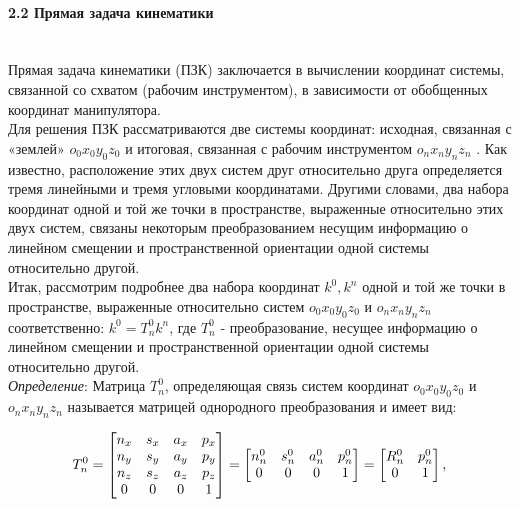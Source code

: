 \paragraph*{2.2 Прямая задача кинематики}$\phantom{-}$\\
\hspace*{\parindent} Прямая задача кинематики (ПЗК) заключается в вычислении координат системы, связанной со схватом (рабочим инструментом), в зависимости от обобщенных координат манипулятора.\\
\hspace*{\parindent}Для решения ПЗК рассматриваются две системы координат: исходная, связанная с «землей» $o_0 x_0 y_0 z_0$ и итоговая, связанная с рабочим инструментом $o_n x_n y_n z_n$ . Как известно, расположение этих двух систем друг относительно друга определяется тремя линейными и тремя угловыми координатами. Другими словами, два набора координат одной и той же точки в пространстве, выраженные относительно этих двух систем, связаны некоторым преобразованием несущим информацию о линейном смещении и пространственной ориентации одной системы относительно другой.\\
\hspace*{\parindent}Итак, рассмотрим подробнее два набора координат $k^0, k^n$ одной и той же точки в пространстве, выраженные относительно систем $o_0 x_0 y_0 z_0$ и $o_n x_n y_n z_n$ соответственно:
$k^0 = T_n^0 k^n$, где $T_n^0$ - преобразование, несущее информацию о линейном смещении и пространственной ориентации одной системы относительно другой.\\
\textit{Определение}: Матрица $T_n^0$, определяющая связь систем координат $o_0 x_0 y_0 z_0$ и $o_n x_n y_n z_n$ называется матрицей однородного преобразования и имеет вид:

\begin{equation*}\label{eq:model}
T_n^0=
    \begin{bmatrix}
    n_x & s_x & a_x & p_x \\
    n_y & s_y & a_y & p_y \\
    n_z & s_z & a_z & p_z \\
    0 & 0 & 0 & 1 \\
    \end{bmatrix}
    =
     \begin{bmatrix}
    n_n^0  &  s_n^0 & a_n^0 & p_n^0 \\
    0 & 0 & 0 & 1\\
    \end{bmatrix}
     =
     \begin{bmatrix}
    R_n^0  &  p_n^0 \\
     0 & 1\\
    \end{bmatrix}
    ,\\
\end{equation*} 

